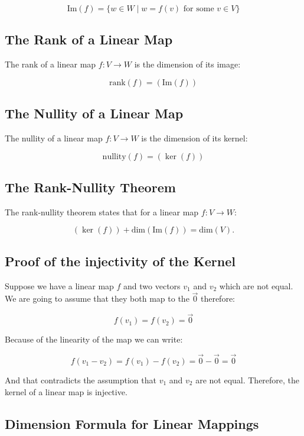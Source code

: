 \[
    \text{Im}(f) = \{ w \in W \mid w = f(v) \text{ for some } v \in V \}
\]
 
\subsection{The Rank of a Linear Map}

The rank of a linear map \( f: V \to W \) is the dimension of its image:

\[
    \text{rank}(f) = (\text{Im}(f))
\]

\subsection{The Nullity of a Linear Map}

The nullity of a linear map \( f: V \to W \) is the dimension of its kernel:
    
\[
    \text{nullity}(f) = (\ker(f))
    
\]

\subsection{The Rank-Nullity Theorem}

The rank-nullity theorem states that for a linear map \( f: V \to W \):

\[
    \text{}(\ker(f)) + \text{dim}(\text{Im}(f)) = \text{dim}(V).
\]

\subsection{Proof of the injectivity of the Kernel}

Suppose we have a linear map \(f\) and two vectors \(v_1\) and \(v_2\) which are not equal. 
We are going to assume that they both map to the \(\vec{0}\) therefore:

\[
    f(v_1) = f(v_2) = \vec{0}
\]

Because of the linearity of the map we can write:

\[
    f(v_1 - v_2) = f(v_1) - f(v_2) = \vec{0} - \vec{0} = \vec{0}
\]

And that contradicts the assumption that \(v_1\) and \(v_2\) are not equal. Therefore, the 
kernel of a linear map is injective.

\subsection{Dimension Formula for Linear Mappings}

